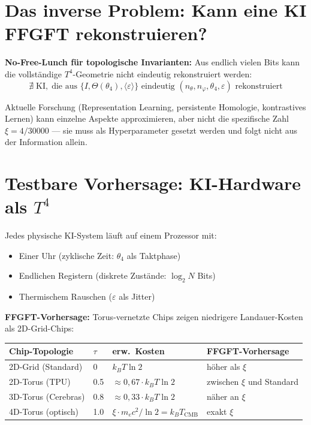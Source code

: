 \section{Das inverse Problem: Kann eine KI FFGFT rekonstruieren?}

\textbf{No-Free-Lunch für topologische Invarianten:} Aus endlich vielen
Bits kann die vollständige $T^4$-Geometrie nicht eindeutig rekonstruiert werden:
\begin{equation}
  \nexists\;\text{KI},\;\text{die aus }
  \{I,\Theta(\theta_4),\langle\varepsilon\rangle\}
  \text{ eindeutig }
  (n_\theta,n_\varphi,\theta_4,\varepsilon) \text{ rekonstruiert}
  \tag{243.14}
\end{equation}

Aktuelle Forschung (Representation Learning, persistente Homologie,
kontrastives Lernen) kann einzelne Aspekte approximieren, aber nicht
die spezifische Zahl $\xi = 4/30000$ --- sie muss als Hyperparameter
gesetzt werden und folgt nicht aus der Information allein.

\section{Testbare Vorhersage: KI-Hardware als $T^4$}

Jedes physische KI-System läuft auf einem Prozessor mit:
\begin{itemize}
  \item Einer Uhr (zyklische Zeit: $\theta_4$ als Taktphase)
  \item Endlichen Registern (diskrete Zustände: $\log_2 N$ Bits)
  \item Thermischem Rauschen ($\varepsilon$ als Jitter)
\end{itemize}

\textbf{FFGFT-Vorhersage:} Torus-vernetzte Chips zeigen niedrigere
Landauer-Kosten als 2D-Grid-Chips:

\begin{center}
\renewcommand{\arraystretch}{1.3}
{\small
\begin{tabular}{p{3.5cm}p{1.5cm}p{3cm}p{4cm}}
\toprule
\textbf{Chip-Topologie} & $\tau$ & \textbf{erw.\ Kosten} & \textbf{FFGFT-Vorhersage} \\
\midrule
2D-Grid (Standard) & 0 & $k_BT\ln 2$ & höher als $\xi$ \\
2D-Torus (TPU) & 0.5 & $\approx 0{,}67\cdot k_BT\ln 2$ & zwischen $\xi$ und Standard \\
3D-Torus (Cerebras) & 0.8 & $\approx 0{,}33\cdot k_BT\ln 2$ & näher an $\xi$ \\
4D-Torus (optisch) & 1.0 & $\xi\cdot m_ec^2/\ln 2 = k_BT_\text{CMB}$ & exakt $\xi$ \\
\bottomrule
\end{tabular}
}
\end{center}

